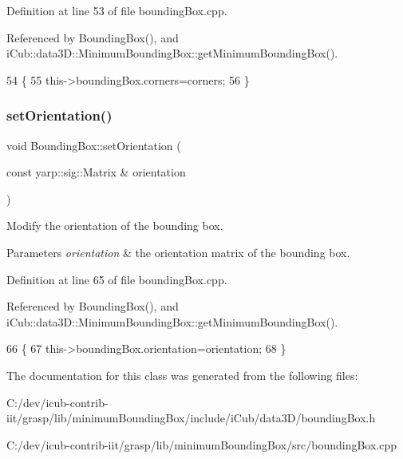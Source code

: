 Definition at line 53 of file bounding\+Box.\+cpp.



Referenced by Bounding\+Box(), and i\+Cub\+::data3\+D\+::\+Minimum\+Bounding\+Box\+::get\+Minimum\+Bounding\+Box().


\begin{DoxyCode}
54 \{
55     this->boundingBox.corners=corners;
56 \}
\end{DoxyCode}
\label{classiCub_1_1data3D_1_1BoundingBox_a9d2cc0a0613750a48567f118d3b3a0eb} 
\subsubsection{\texorpdfstring{set\+Orientation()}{setOrientation()}}
{\footnotesize\ttfamily void Bounding\+Box\+::set\+Orientation (\begin{DoxyParamCaption}\item[{const yarp\+::sig\+::\+Matrix \&}]{orientation }\end{DoxyParamCaption})}



Modify the orientation of the bounding box. 


\begin{DoxyParams}{Parameters}
{\em orientation} & the orientation matrix of the bounding box. \\
\hline
\end{DoxyParams}


Definition at line 65 of file bounding\+Box.\+cpp.



Referenced by Bounding\+Box(), and i\+Cub\+::data3\+D\+::\+Minimum\+Bounding\+Box\+::get\+Minimum\+Bounding\+Box().


\begin{DoxyCode}
66 \{
67     this->boundingBox.orientation=orientation;
68 \}
\end{DoxyCode}


The documentation for this class was generated from the following files\+:\begin{DoxyCompactItemize}
\item 
C\+:/dev/icub-\/contrib-\/iit/grasp/lib/minimum\+Bounding\+Box/include/i\+Cub/data3\+D/bounding\+Box.\+h\item 
C\+:/dev/icub-\/contrib-\/iit/grasp/lib/minimum\+Bounding\+Box/src/bounding\+Box.\+cpp\end{DoxyCompactItemize}
